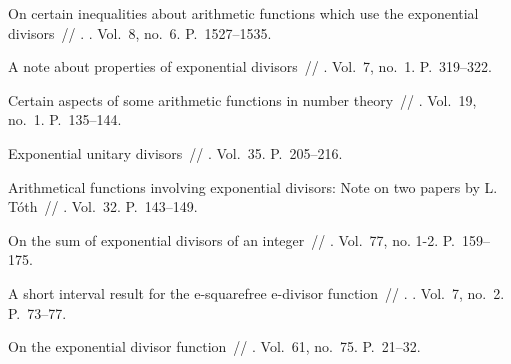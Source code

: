 \documentclass[12pt,a4paper]{article}
\begin{document}
\begin{thebibliography}{10}
 On certain inequalities about arithmetic functions which
  use the exponential divisors~//
  \href{http://dx.doi.org/10.1142/S1793042112500923}{}. \BibDash
{}. \BibDash
\newblock Vol.~8, no.~6. \BibDash
\newblock P.~1527--1535.

 A note about properties of exponential divisors~//
   \BibDash
{}. \BibDash
\newblock Vol.~7, no.~1. \BibDash
\newblock P.~319--322.

 Certain aspects of some arithmetic functions in
  number theory~//  \BibDash
{}. \BibDash
\newblock Vol.~19, no.~1. \BibDash
\newblock P.~135--144.

 Exponential unitary divisors~//  \BibDash
{}. \BibDash
\newblock Vol.~35. \BibDash
\newblock P.~205--216.

 Arithmetical functions involving exponential
  divisors: Note on two papers by L. Tóth~//  \BibDash
{}. \BibDash
\newblock Vol.~32. \BibDash
\newblock P.~143--149.

 On the sum of exponential divisors of an
  integer~// \href{http://dx.doi.org/10.1023/A:1006596009566}{} \BibDash
{}. \BibDash
\newblock Vol.~77, no. 1-2. \BibDash
\newblock P.~159--175.

 A short interval result for the
  e-squarefree e-divisor function~// . \BibDash
{}. \BibDash
\newblock Vol.~7, no.~2. \BibDash
\newblock P.~73--77.

 On the exponential divisor function~//  \BibDash
{}. \BibDash
\newblock Vol.~61, no.~75. \BibDash
\newblock P.~21--32.


\end{thebibliography}
\end{document}
